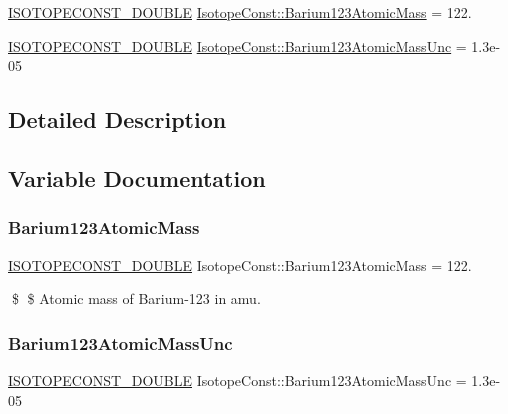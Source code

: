 \begin{DoxyCompactItemize}
\item 
\mbox{\hyperlink{group___isotope_const-_macros_ga8f45a7272ce02c0b4c65c44636ed719a}{I\+S\+O\+T\+O\+P\+E\+C\+O\+N\+S\+T\+\_\+\+D\+O\+U\+B\+LE}} \mbox{\hyperlink{group___isotope_const-_barium-_ba123_ga2566bd6cf462e5a511108236d6ffbd2a}{Isotope\+Const\+::\+Barium123\+Atomic\+Mass}} = 122.
\item 
\mbox{\hyperlink{group___isotope_const-_macros_ga8f45a7272ce02c0b4c65c44636ed719a}{I\+S\+O\+T\+O\+P\+E\+C\+O\+N\+S\+T\+\_\+\+D\+O\+U\+B\+LE}} \mbox{\hyperlink{group___isotope_const-_barium-_ba123_gad9157d547dbc937780d4cf77666a8f0b}{Isotope\+Const\+::\+Barium123\+Atomic\+Mass\+Unc}} = 1.\+3e-\/05
\end{DoxyCompactItemize}


\subsection{Detailed Description}


\subsection{Variable Documentation}
\mbox{\label{group___isotope_const-_barium-_ba123_ga2566bd6cf462e5a511108236d6ffbd2a}} 
\subsubsection{\texorpdfstring{Barium123\+Atomic\+Mass}{Barium123AtomicMass}}
{\footnotesize\ttfamily \mbox{\hyperlink{group___isotope_const-_macros_ga8f45a7272ce02c0b4c65c44636ed719a}{I\+S\+O\+T\+O\+P\+E\+C\+O\+N\+S\+T\+\_\+\+D\+O\+U\+B\+LE}} Isotope\+Const\+::\+Barium123\+Atomic\+Mass = 122.}

\$ \$ Atomic mass of Barium-\/123 in amu. \mbox{\label{group___isotope_const-_barium-_ba123_gad9157d547dbc937780d4cf77666a8f0b}} 
\subsubsection{\texorpdfstring{Barium123\+Atomic\+Mass\+Unc}{Barium123AtomicMassUnc}}
{\footnotesize\ttfamily \mbox{\hyperlink{group___isotope_const-_macros_ga8f45a7272ce02c0b4c65c44636ed719a}{I\+S\+O\+T\+O\+P\+E\+C\+O\+N\+S\+T\+\_\+\+D\+O\+U\+B\+LE}} Isotope\+Const\+::\+Barium123\+Atomic\+Mass\+Unc = 1.\+3e-\/05}

